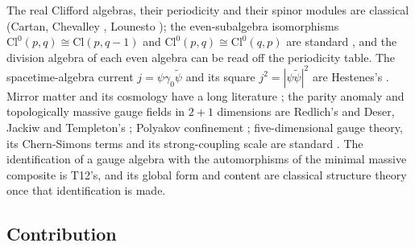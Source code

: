 \documentclass[11pt]{article}
\theoremstyle{definition}
\newcommand{\Cl}{\mathrm{Cl}}
\newcommand{\rev}[1]{\widetilde{#1}}
\begin{document}
The real Clifford algebras, their periodicity and their spinor modules are classical (Cartan, Chevalley \cite{Chevalley1954}, Lounesto \cite{Lounesto2001}); the even-subalgebra isomorphisms $\Cl^{0}(p,q) \cong \Cl(p,q-1)$ and $\Cl^{0}(p,q) \cong \Cl^{0}(q,p)$ are standard \cite{Porteous1995, Lounesto2001}, and the division algebra of each even algebra can be read off the periodicity table. The spacetime-algebra current $j = \psi\gamma_{0}\rev{\psi}$ and its square $j^{2} = |\psi\rev{\psi}|^{2}$ are Hestenes's \cite{Hestenes1966, DoranLasenby2003}. Mirror matter and its cosmology have a long literature \cite{FootMirror2004, RouxCline2020}; the parity anomaly and topologically massive gauge fields in $2+1$ dimensions are Redlich's and Deser, Jackiw and Templeton's \cite{Redlich1984, DJT1982}; Polyakov confinement \cite{Polyakov1977}; five-dimensional gauge theory, its Chern-Simons terms and its strong-coupling scale are standard \cite{IMS1997, CLP2000}. The identification of a gauge algebra with the automorphisms of the minimal massive composite is T12's, and its global form and content are classical structure theory once that identification is made.

\subsection*{Contribution}
\end{document}
